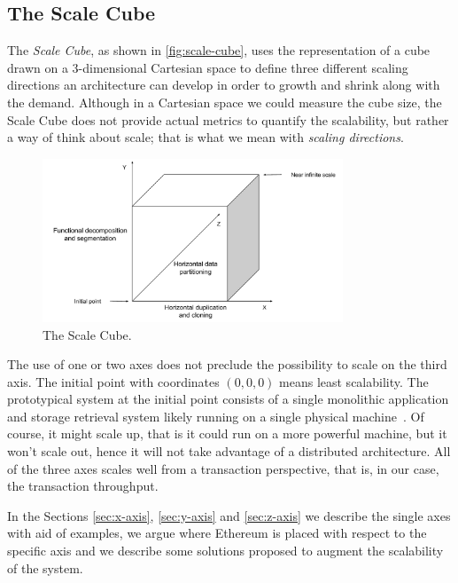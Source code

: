 \subsection{The Scale Cube}
\label{sec:scale-cube}

The \emph{Scale Cube}, as shown in \autoref{fig:scale-cube}, uses the
representation of a cube drawn on a 3-dimensional Cartesian space to define
three different scaling directions an architecture can develop in order to
growth and shrink along with the demand. Although in a Cartesian space we could
measure the cube size, the Scale Cube does not provide actual metrics to
quantify the scalability, but rather a way of think about scale; that is what we
mean with \emph{scaling directions}.

\begin{figure}[h]
	\begin{center}
		\includegraphics[width=0.8\textwidth]{./res/img/scale-cube.pdf}
	\end{center}
	\caption{The Scale Cube.}
	\label{fig:scale-cube}
\end{figure}

The use of one or two axes does not preclude the possibility to scale on the
third axis. The initial point with coordinates $(0,0,0)$ means least
scalability. The prototypical system at the initial point consists of a single
monolithic application and storage retrieval system likely running on a single
physical machine~\cite{bib:art-of-scalability}. Of course, it might scale up,
that is it could run on a more powerful machine, but it won't scale out, hence
it will not take advantage of a distributed architecture. All of the three axes
scales well from a transaction perspective, that is, in our case, the
transaction throughput.

In the Sections \ref{sec:x-axis}, \ref{sec:y-axis} and \ref{sec:z-axis} we
describe the single axes with aid of examples, we argue where Ethereum is placed
with respect to the specific axis and we describe some solutions proposed to
augment the scalability of the system.
